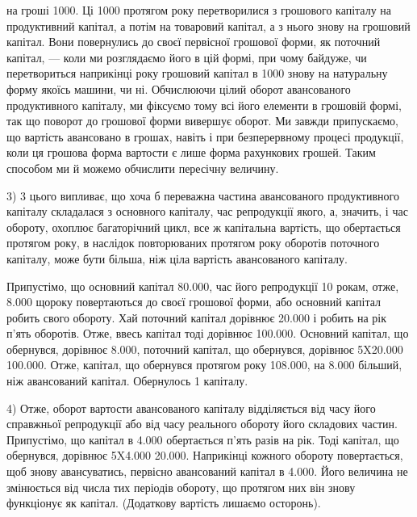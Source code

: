 \parcont{}  %
на гроші  \deq{} 1000. Ці 1000 протягом року
перетворилися з грошового капіталу на продуктивний капітал, а потім на
товаровий капітал, а з нього знову на грошовий капітал. Вони повернулись
до своєї первісної грошової форми, як поточний капітал, — коли ми
розглядаємо його в цій формі, при чому байдуже, чи перетвориться наприкінці
року грошовий капітал в 1000 знову на натуральну
форму якоїсь машини, чи ні. Обчислюючи цілий оборот авансованого продуктивного
капіталу, ми фіксуємо тому всі його елементи в грошовій формі,
так що поворот до грошової форми вивершує оборот. Ми завжди припускаємо,
що вартість авансовано в грошах, навіть і при безперервному
процесі продукції, коли ця грошова форма вартости є лише форма
рахункових грошей. Таким способом ми й можемо обчислити пересічну
величину.

3) 3 цього випливає, що хоча б переважна частина авансованого
продуктивного капіталу складалася з основного капіталу, час репродукції
якого, а, значить, і час обороту, охоплює багаторічний цикл, все ж капітальна
вартість, що обертається протягом року, в наслідок повторюваних
протягом року оборотів поточного капіталу, може бути більша, ніж ціла
вартість авансованого капіталу.

Припустімо, що основний капітал \deq{} \num{80.000}, час його репродукції
\deq{} 10 рокам, отже, \num{8.000} щороку повертаються до своєї
грошової форми, або основний капітал робить  свого обороту. Хай
поточний капітал дорівнює \num{20.000} і робить на рік п’ять оборотів.
Отже, ввесь капітал тоді дорівнює \num{100.000}. Основний
капітал, що обернувся, дорівнює \num{8.000}, поточний капітал, що
обернувся, дорівнює 5X\num{20.000} \deq{} \num{100.000}. Отже, капітал, що
обернувся протягом року \deq{} \num{108.000}, на \num{8.000} більший,
ніж авансований капітал. Обернулось 1 \dplus{}  капіталу.

4) Отже, оборот вартости авансованого капіталу відділяється
від часу його справжньої репродукції або від часу реального обороту
його складових частин. Припустімо, що капітал в \num{4.000} обертається
п’ять разів на рік. Тоді капітал, що обернувся, дорівнює
5X\num{4.000} \deq{} \num{20.000}. Наприкінці кожного обороту повертається,
щоб знову авансуватись, первісно авансований капітал в \num{4.000}.
Його величина не змінюється від числа тих періодів обороту, що
протягом них він знову функціонує як капітал. (Додаткову вартість
лишаємо осторонь).

